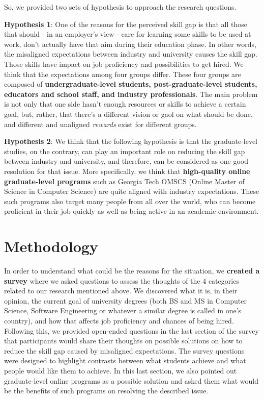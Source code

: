 \documentclass{sigchi}
\begin{document}
So, we provided two sets of hypothesis to approach the research questions.

\textbf{Hypothesis 1}: One of the reasons for the perceived skill gap is that all those that should - in an employer's view - care for learning some skills to be used at work, don't actually have that aim during their education phase. In other words, the misaligned expectations between industry and university causes the skill gap. Those skills have impact on job proficiency and possibilities to get hired. We think that the expectations among four groups differ. These four groups are composed of \textbf{undergraduate-level students, post-graduate-level students, educators and school staff, and industry professionals}. The main problem is not only that one side hasn’t enough resources or skills to achieve a certain goal, but, rather, that there’s a different vision or gaol on what should be done, and different and unaligned \textit{rewards} exist for different groups.  

\textbf{Hypothesis 2}:  We think that the following hypothesis is that the graduate-level studies, on the contrary, can play an important role on reducing the skill gap between industry and university, and therefore, can be considered as one good resolution for that issue. More specifically, we think that \textbf{high-quality online graduate-level programs} such as Georgia Tech OMSCS (Online Master of Science in Computer Science) are quite aligned with industry expectations. These such programs also target many people from all over the world, who can become proficient in their job quickly as well as being active in an academic environment.

\section{Methodology}
In order to understand what could be the reasons for the situation, we \textbf{created a survey} where we asked questions to assess the thoughts of the 4 categories  related to our research mentioned above. We discovered what it is, in their opinion, the current goal of university degrees (both BS and MS in Computer Science, Software Engineering or whatever a similar degree is called in one's country), and how that affects job proficiency and chances of being hired. Following this, we provided open-ended questions in the last section of the survey that participants would share their thoughts on possible solutions on how to reduce the skill gap caused by misaligned expectations. The survey questions were designed to highlight contrasts between what students achieve and what people would like them to achieve. In this last section, we also pointed out graduate-level online programs as a possible solution and asked them what would be the benefits of such programs on resolving the described issue.
\end{document}
